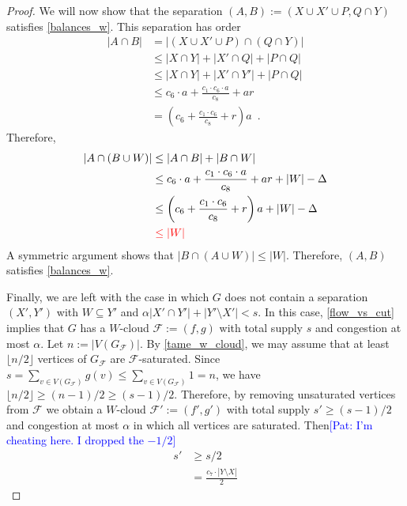 \documentclass{patmorin}
\newcommand{\pat}[1]{\textcolor{Blue}{[Pat: #1]}}
\begin{document}
\begin{proof}
  We will now show that the separation $(A,B):=(X\cup X'\cup P,Q\cap Y)$ satisfies \cref{balances_w}.  This separation has order
  \begin{align*}
    |A\cap B|
    & = |(X\cup X'\cup P)\cap (Q\cap Y)| \\
    & \le |X\cap Y|+|X'\cap Q|+|P\cap Q| \\
    & \le |X\cap Y| + |X'\cap Y'| + |P\cap Q| \\
    & \le c_6\cdot a + \frac{c_1\cdot c_6\cdot a}{c_8} + ar \\
    & = \left(c_6 + \frac{c_1\cdot c_6}{c_8} + r\right)a \enspace .
  \end{align*}
  Therefore,
  \begin{align*}
    |A\cap (B\cup W)|
    & \le |A\cap B| + |B\cap W| \\
    & \le c_6\cdot a + \frac{c_1\cdot c_6\cdot a}{c_8} + ar + |W| - \Delta \\
    & \le \left(c_6 + \frac{c_1\cdot c_6}{c_8} + r\right)a + |W| - \Delta \\
    &\mathcolor{red}{\le |W|}
  \end{align*}
  A symmetric argument shows that $|B\cap (A\cup W)|\le |W|$.  Therefore, $(A,B)$ satisfies \cref{balances_w}.

  Finally, we are left with the case in which $G$ does not contain a separation $(X',Y')$ with $W\subseteq Y'$ and $\alpha|X'\cap Y'|+|Y'\setminus X'|<s$.  In this case, \cref{flow_vs_cut} implies that $G$ has a $W$-cloud $\mathcal{F}:=(f,g)$ with total supply $s$ and congestion at most $\alpha$.
  Let $n:=|V(G_{\mathcal{F}})|$.  By \cref{tame_w_cloud}, we may assume that at least $\lfloor n/2\rfloor$ vertices of  $G_{\mathcal{F}}$ are $\mathcal{F}$-saturated.
  Since $s=\sum_{v\in V(G_{\mathcal{F}})} g(v)\le \sum_{v\in V(G_{\mathcal{F}})} 1=n$, we have $\lfloor n/2\rfloor \ge (n-1)/2 \ge (s-1)/2$.  Therefore, by removing unsaturated vertices from $\mathcal{F}$ we obtain a $W$-cloud $\mathcal{F}':=(f',g')$ with total supply $s'\ge(s-1)/2$ and congestion at most $\alpha$ in which all vertices are saturated.
  Then\pat{I'm cheating here. I dropped the $-1/2$}
  \begin{align*}
     s' & \ge s/2 \\
        & = \frac{c_7\cdot|Y\setminus X|}{2}
  \end{align*}


\end{proof}
\end{document}
